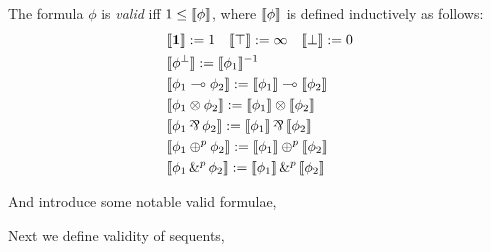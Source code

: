 \begin{definition}
    The formula $\phi$ is \emph{valid} iff $1 \leq \llbracket \phi \rrbracket$, where $\llbracket \phi \rrbracket$ is defined inductively as follows:
    \begin{equation}
\label{semantics}
    \begin{split}
    &\m{\unit} := 1 \quad \m{\top} := \infty \quad \m{\bot} := 0\\
    &\m{\ldual{\phi}} := \edual{\m{\phi_{1}}}\\
    &\m{\phi_{1} \ediv \phi_{2}} := \m{\phi_{1}} \ediv \m{\phi_{2}}\\
    &\m{\phi_{1} \conmul \phi_{2}} := \m{\phi_{1}} \conmul \m{\phi_{2}}\\
    &\m{\phi_{1} \dismul \phi_{2}} := \m{\phi_{1}} \dismul \m{\phi_{2}}\\
    &\m{\phi_{1} \psum{p} \phi_{2}} := \m{\phi_{1}} \psum{p} \m{\phi_{2}}\\
    &\m{\phi_{1} \phsum{p} \phi_{2}} := \m{\phi_{1}} \phsum{p} \m{\phi_{2}}\\
    \end{split}
\end{equation}
\end{definition}

And introduce some notable valid formulae,


Next we define validity of sequents,


